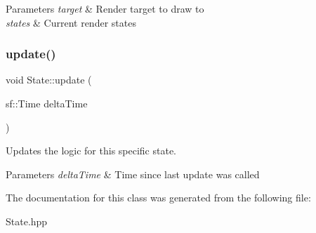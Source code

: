\begin{DoxyParams}{Parameters}
{\em target} & Render target to draw to \\
\hline
{\em states} & Current render states \\
\hline
\end{DoxyParams}
\mbox{\label{class_state_acd1d5612d4166c405fb4a11b3a1f1bd3}} 
\subsubsection{\texorpdfstring{update()}{update()}}
{\footnotesize\ttfamily void State\+::update (\begin{DoxyParamCaption}\item[{sf\+::\+Time}]{delta\+Time }\end{DoxyParamCaption})\hspace{0.3cm}{\ttfamily [pure virtual]}}



Updates the logic for this specific state. 


\begin{DoxyParams}{Parameters}
{\em delta\+Time} & Time since last update was called \\
\hline
\end{DoxyParams}


The documentation for this class was generated from the following file\+:\begin{DoxyCompactItemize}
\item 
State.\+hpp\end{DoxyCompactItemize}
